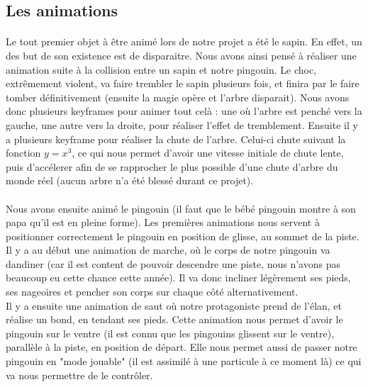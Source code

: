 \documentclass[11pt]{article}
\begin{document}
    \subsection{Les animations}

    \paragraph{}
    Le tout premier objet à être animé lors de notre projet a été le sapin. En effet, un des but de son existence est de disparaitre.
    Nous avons ainsi pensé à réaliser une animation suite à la collision entre un sapin et notre pingouin.
    Le choc, extrêmement violent, va faire trembler le sapin plusieurs fois, et finira par le faire tomber définitivement (ensuite la magie opère et l'arbre disparait).
    Nous avons donc plusieurs keyframes pour animer tout celà : une où l'arbre est penché vers la gauche, une autre vers la droite, pour réaliser l'effet de tremblement.
    Ensuite il y a plusieurs keyframe pour réaliser la chute de l'arbre.
    Celui-ci chute suivant la fonction $y=x^3$, ce qui nous permet d'avoir une vitesse initiale de chute lente, puis d'accélerer afin de se rapprocher le plus possible d'une chute d'arbre du monde réel (aucun arbre n'a été blessé durant ce projet).

    \paragraph{}
    Nous avons ensuite animé le pingouin (il faut que le bébé pingouin montre à son papa qu'il est en pleine forme).
    Les premières animations nous servent à positionner correctement le pingouin en position de glisse, au sommet de la piste.
    Il y a au début une animation de marche, où le corps de notre pingouin va dandiner (car il est content de pouvoir descendre une piste, nous n'avons pas beaucoup eu cette chance cette année).
    Il va donc incliner légèrement ses pieds, ses nageoires et pencher son corps sur chaque côté alternativement.\\
    Il y a ensuite une animation de saut où notre protagoniste prend de l'élan, et réalise un bond, en tendant ses pieds.
    Cette animation nous permet d'avoir le pingouin sur le ventre (il est connu que les pingouins glissent sur le ventre), parallèle à la piste, en position de départ.
    Elle nous permet aussi de passer notre pingouin en "mode jouable" (il est assimilé à une particule à ce moment là) ce qui va nous permettre de le contrôler.
\end{document}
